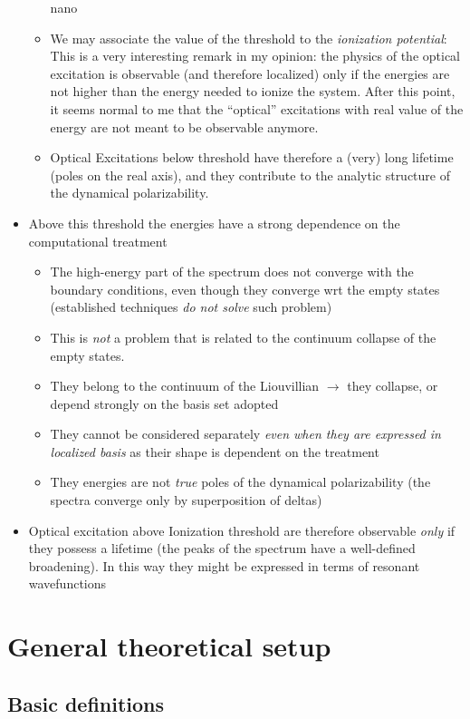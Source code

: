 \documentclass[a4paper]{article}
\newcommand{\lb}{\label}
\begin{document}
\begin{itemize}
\begin{itemize}
nano\item We may associate the value of the threshold to the \emph{ionization potential}: This is a very interesting remark in my opinion: the physics of the optical excitation is observable 
(and therefore localized) only if the energies are not higher than the energy needed to ionize the system. After this point, it seems normal to me that the ``optical'' excitations with 
real value of the energy are not  meant to be observable anymore.
\item Optical Excitations below threshold have therefore a (very) long lifetime (poles on the real axis), and they contribute to the analytic structure of the dynamical polarizability.
\end{itemize}
\item Above this threshold the energies have a strong dependence on the computational treatment
\begin{itemize}
\item The high-energy part of the 
spectrum does not converge with the 
boundary conditions, even though they converge wrt the empty states (established techniques \emph{do not solve} such problem)
\item This is \emph{not} a problem that is related to the continuum collapse of the empty states.
\item They belong to the continuum of  the Liouvillian $\rightarrow$ they collapse, or depend strongly on the basis set adopted
\item They cannot be considered separately \emph{even when they are expressed in localized basis} as 
their shape is dependent on the treatment
\item They energies are not \emph{true} poles of the dynamical polarizability (the spectra converge only by superposition of deltas)
\end{itemize}
\item Optical excitation above Ionization threshold are therefore observable \emph{only} if they possess a lifetime (the peaks of the spectrum have a well-defined broadening). 
In this way they might be expressed in terms of resonant wavefunctions
\end{itemize}

\section{General theoretical setup}

\subsection{Basic definitions}\lb{BasicDef}
\end{document}
